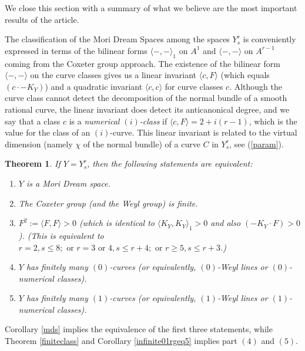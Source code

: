 \documentclass[12pt]{article}
\newtheorem{theorem}[equation]{Theorem}
\numberwithin{equation}{section}
\numberwithin{subeq}{equation}
\begin{document}
We close this section with a summary of what we believe are the most important results of the article.

The classification of the Mori Dream Spaces among the spaces $Y^r_s$
is conveniently expressed in terms of the bilinear forms $\langle -,-\rangle_1$ on $A^1$
and $\langle -,-\rangle$ on $A^{r-1}$
coming from the Coxeter group approach.
The existence of the bilinear form $\langle -,-\rangle$ on the curve classes
gives us a linear invariant $\langle c,F\rangle$
(which equals $(c \cdot -K_Y)$)
and a quadratic invariant $\langle c,c\rangle$
for curve classes $c$.
Although the curve class cannot detect the decomposition of the normal bundle
of a smooth rational curve, the linear invariant does detect its anticanonical degree,
and we say that a class $c$ is a \emph{numerical $(i)$-class}
if $\langle c,F\rangle =  2+i(r-1)$,
which is the value for the class of an $(i)$-curve.
This linear invariant is related to the virtual dimension
(namely $\chi$ of the normal bundle) of
a curve $C$ in $Y^r_s$, see (\ref{param}).

 
\begin{theorem} If $Y=Y^r_s$, then the following statements are equivalent:
\begin{enumerate}
\item $Y$ is a Mori Dream space.
\item The Coxeter group (and the Weyl group) is finite.
\item $F^2:=\langle F, F \rangle >0$
(which is identical to $\langle K_Y, K_Y \rangle_1 >0$ and also $(-K_Y \cdot F) > 0$).
(This is equivalent to $r=2, s \leq 8; \text{ or }r=3 \text{ or }4, s \leq r+4; \text{ or } r\geq 5, s \leq r+3$.)
\item $Y$ has finitely many $(0)$-curves (or equivalently, $(0)$-Weyl lines or $(0)$-numerical classes).
\item $Y$ has finitely many $(1)$-curves (or equivalently, $(1)$-Weyl lines or $(1)$-numerical classes).
\end{enumerate}
\end{theorem}


Corollary \ref{mds} implies the equivalence of the first three statements,
while Theorem \ref{finiteclass} and Corollary \ref{infinite01rgeq5}
implies part $(4)$ and $(5)$.
\end{document}
